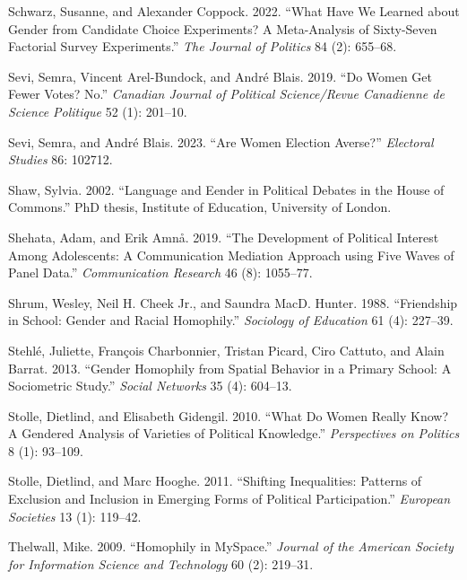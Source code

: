 \documentclass[
  letterpaper,
  DIV=11,
  numbers=noendperiod]{scrreprt}
\newlength{\cslhangindent}
\newlength{\cslentryspacingunit} %
\newenvironment{CSLReferences}[2] %
 {%
  \setlength{\parindent}{0pt}
  \ifodd #1
  \let\oldpar\par
  \def\par{\hangindent=\cslhangindent\oldpar}
  \fi
  \setlength{\parskip}{#2\cslentryspacingunit}
 }%
 {}
\begin{document}
\begin{CSLReferences}{1}{0}
\leavevmode{}%
Schwarz, Susanne, and Alexander Coppock. 2022. {``{What Have We Learned
about Gender from Candidate Choice Experiments? A Meta-Analysis of
Sixty-Seven Factorial Survey Experiments}.''} \emph{The Journal of
Politics} 84 (2): 655--68.

\leavevmode{}%
Sevi, Semra, Vincent Arel-Bundock, and André Blais. 2019. {``{Do Women
Get Fewer Votes? No.}''} \emph{Canadian Journal of Political
Science/Revue Canadienne de Science Politique} 52 (1): 201--10.

\leavevmode{}%
Sevi, Semra, and André Blais. 2023. {``{Are Women Election Averse?}''}
\emph{Electoral Studies} 86: 102712.

\leavevmode{}%
Shaw, Sylvia. 2002. {``{Language and Eender in Political Debates in the
House of Commons}.''} PhD thesis, Institute of Education, University of
London.

\leavevmode{}%
Shehata, Adam, and Erik Amnå. 2019. {``{The Development of Political
Interest Among Adolescents: A Communication Mediation Approach using
Five Waves of Panel Data}.''} \emph{Communication Research} 46 (8):
1055--77.

\leavevmode{}%
Shrum, Wesley, Neil H. Cheek Jr., and Saundra MacD. Hunter. 1988.
{``{Friendship in School: Gender and Racial Homophily}.''}
\emph{Sociology of Education} 61 (4): 227--39.

\leavevmode{}%
Stehlé, Juliette, François Charbonnier, Tristan Picard, Ciro Cattuto,
and Alain Barrat. 2013. {``{Gender Homophily from Spatial Behavior in a
Primary School: A Sociometric Study}.''} \emph{Social Networks} 35 (4):
604--13.

\leavevmode{}%
Stolle, Dietlind, and Elisabeth Gidengil. 2010. {``{What Do Women Really
Know? A Gendered Analysis of Varieties of Political Knowledge}.''}
\emph{Perspectives on Politics} 8 (1): 93--109.

\leavevmode{}%
Stolle, Dietlind, and Marc Hooghe. 2011. {``{Shifting Inequalities:
Patterns of Exclusion and Inclusion in Emerging Forms of Political
Participation}.''} \emph{European Societies} 13 (1): 119--42.

\leavevmode{}%
Thelwall, Mike. 2009. {``{Homophily in MySpace}.''} \emph{Journal of the
American Society for Information Science and Technology} 60 (2):
219--31.


\end{CSLReferences}
\end{document}
